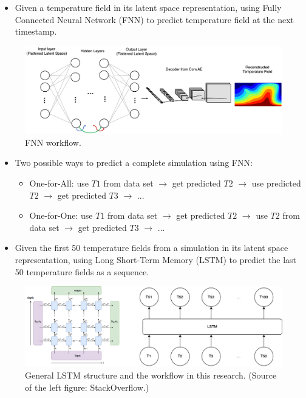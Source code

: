 {\begin{itemize}
    \item Given a temperature field in its latent space representation, using Fully Connected Neural Network (FNN) to predict temperature field at the next timestamp.
\end{itemize}

\begin{figure}[H]
    \centering
    \includegraphics[width=0.8\linewidth]{figures/FNN_workflow.png}
    \caption{FNN workflow.}
\end{figure}

\begin{itemize}
    \item Two possible ways to predict a complete simulation using FNN:

        \begin{itemize}
            \item One-for-All: use $T1$ from data set $\rightarrow$ get predicted $T2$ $\rightarrow$ use predicted $T2$ $\rightarrow$ get predicted $T3$ $\rightarrow$ ...

            \item One-for-One: use $T1$ from data set $\rightarrow$ get predicted $T2$ $\rightarrow$ use $T2$ from data set $\rightarrow$ get predicted $T3$ $\rightarrow$ ...
        \end{itemize}

    \item Given the first 50 temperature fields from a simulation in its latent space representation, using Long Short-Term Memory (LSTM) to predict the last 50 temperature fields as a sequence.

\end{itemize}

\begin{figure}[H]
    \centering
    \includegraphics[width=0.8\linewidth]{figures/LSTM_workflow.png}
    \caption{General LSTM structure and the workflow in this research. (Source of the left figure: StackOverflow.)}
\end{figure}
}

